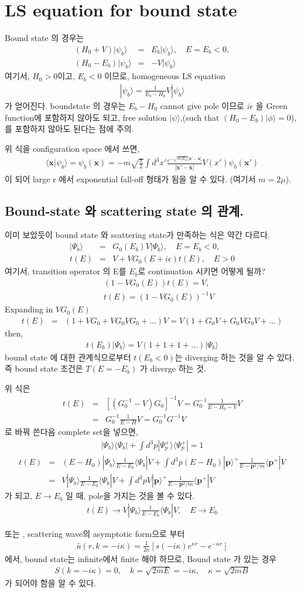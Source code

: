 \documentclass[10pt]{article}
\def\bm{\boldsymbol}
\newcommand{\bea}{\begin{eqnarray}}
\newcommand{\eea}{\end{eqnarray}}
\newcommand{\no}{\nonumber \\}
\def\vp{{\bm p}}
\def\vx{{\bm x}}
\def\la{\langle}
\def\ra{\rangle}
\begin{document}
\section{LS equation for bound state}
Bound state 의 경우는 
\bea
(H_0+V)|\psi_b\ra&=&E_b|\psi_b\ra, \quad E=E_b<0,\no
(H_0-E_b)|\psi_b\ra&=&-V|\psi_b\ra  
\eea
여기서, $H_0>0$이고, $E_b<0$ 이므로, 
homogeneous LS equation
\bea
|\psi_b\ra=\frac{1}{E_b-H_0}V|\psi_b\ra
\eea
가 얻어진다. boundstate 의 경우는 $E_b-H_0$ cannot give pole 이므로
$i\epsilon$ 을 Green function에 포함하지 않아도 되고,
free solution $|\psi\ra$,(such that $(H_0-E_b)|\phi\ra=0$), 를 
포함하지 않아도 된다는 점에 주의. 

위 식을 configuration space 에서 쓰면,
\bea
\la \vx|\psi_b\ra=\psi_b(\vx)=-m\sqrt{\frac{\pi}{2}}\int d^3 x' 
            \frac{e^{-\sqrt{m|E_b|}|\vx'-\vx|}}{|\vx'-\vx|} V(x')\psi_b(\vx')
\eea
이 되어 large r 에서 exponential fall-off 형태가 됨을 알 수 있다.
(여기서 $m=2\mu$). 

\subsection{Bound-state 와 scattering state 의 관계.}
이미 보았듯이 bound state 와 scattering state가 만족하는 식은 약간 다르다.
\bea
|\Psi_b\ra&=&G_0(E_b)V|\Psi_b\ra, \quad E=E_b<0,\no
t(E)&=&V+V G_0(E+i\epsilon) t(E),\quad E>0
\eea
여기서, transition operator 의 E를 $E_b$로 continuation 시키면 어떻게 될까?
\bea
& &(1-VG_0(E))t(E)=V,\no 
& & t(E)=(1-V G_0(E))^{-1} V
\eea
Expanding in $VG_0(E)$
\bea
t(E)&=&(1+VG_0+VG_0VG_0+\dots)V=V(1+G_0V+G_0V G_0V+\dots)
\eea
then,
\bea
t(E_b)|\Psi_b\ra=V(1+1+1+\dots)|\Psi_b\ra
\eea
bound state 에 대한  관계식으로부터 $t(E_b<0)$는 diverging 하는 것을
알 수 있다. 즉 bound state 조건은 $T(E=-E_b)$ 가 diverge 하는 것.

위 식은 
\bea
t(E)&=&[(G_0^{-1}-V)G_0]^{-1}V=G_0^{-1}\frac{1}{E-H_0-V}V\no 
     &=&G_0^{-1}\frac{1}{E-H}V=G_0^{-1} G^{-1} V
\eea
로 바꿔 쓴다음 complete set을 넣으면,
\bea
|\Psi_b\ra\la\Psi_b|+\int d^3 p |\Psi_p^{+}\ra\la\Psi_p^{+}|=1 
\eea
\bea
t(E)&=&(E-H_0)|\Psi_b\ra\frac{1}{E-E_b}\la \Psi_b|V
        +\int d^3p (E-H_0)|\vp\ra^+ \frac{1}{E-\vp^2/m}\la \vp^{+}| V \no
      &=&V|\Psi_b\ra\frac{1}{E-E_b}\la\Psi_b|V
         +\int d^3p V|\vp\ra^+ \frac{1}{E-\vp^2/m}\la \vp^{+}| V 
\eea
가 되고, $E\to E_b$ 일 때, pole을 가지는 것을 볼 수 있다.
\bea
t(E)\to V|\Psi_b\ra\frac{1}{E-E_b}\la\Psi_b|V, \quad E\to E_b
\eea

또는 , scattering wave의 asymptotic form으로 부터
\bea
\bar{u}(r,k=-i\kappa)=\frac{1}{2\kappa}
  [s(-i\kappa) e^{\kappa r}- e^{-\kappa r}]
\eea
에서, bound state는 infinite에서 finite 해야 하므로,
Bound state 가 있는 경우
\bea
S(k=-i\kappa)=0,\quad k=\sqrt{2mE}=-i\kappa,\quad \kappa=\sqrt{2mB}
\eea
가 되어야 함을 알 수 있다.
\end{document}
